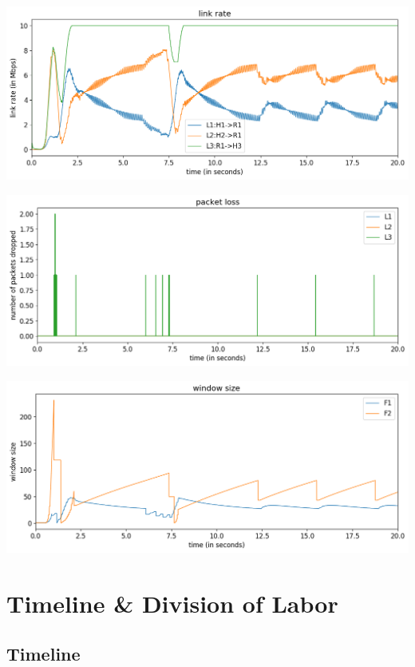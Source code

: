 \documentclass{article}
\begin{document}
\includegraphics[width = \textwidth]{"test_case_custom link rate"}

\includegraphics[width = \textwidth]{"test_case_custom packet loss"}

\includegraphics[width = \textwidth]{"test_case_custom window size"}



\section{Timeline \& Division of Labor}

\subsection{Timeline}
\end{document}

